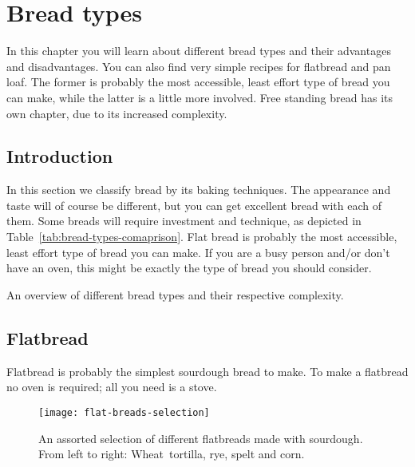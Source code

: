 \chapter{Bread types}%
\label{ch:bread-types}
\begin{quoting}
In this chapter you will learn about different bread types and their
advantages and disadvantages.  You can also find very simple recipes for
flatbread and pan loaf.  The former is probably the most accessible, least
effort type of bread you can make, while the latter is a little more involved.
Free standing bread has its own chapter, due to its increased complexity.
\end{quoting}

\section{Introduction}%
\label{sec:intro}

In this section we classify bread by its baking techniques. The appearance and
taste will of course be different, but you can get excellent bread with each
of them. Some breads will require investment and technique, as depicted in
Table~\ref{tab:bread-types-comaprison}.  Flat bread is probably the most
accessible, least effort type of bread you can make. If you are a busy person
and/or don’t have an oven, this might be exactly the type of bread you should
consider. 
\begin{table}[!htb]
    \begin{center}
        
        \caption[Different bread types]{An overview of different bread types
            and their respective complexity.}%
        \label{tab:bread-types-comparison}
    \end{center}
\end{table}

\section{Flatbread}%
\label{sec:flatbread}

Flatbread is probably the simplest sourdough bread to make.
To make a flatbread no oven is required; all you need is a stove.

\begin{figure}[!htb]
  \texttt{[image: flat-breads-selection]}
  \caption[Flatbread selection with different flours]{An assorted selection of
      different flatbreads made with sourdough. From left to right:
      Wheat~tortilla, rye, spelt and corn.}%
\end{figure}

